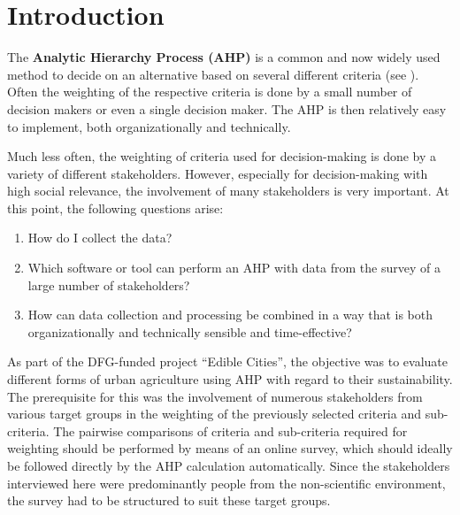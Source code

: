 \documentclass [oneside,10pt,a4paper,ngerman,BCOR10mm,headsepline,parindent,final]{scrartcl}
\providecommand{\tightlist}{%
      \setlength{\itemsep}{0pt}\setlength{\parskip}{0pt}}
\begin{document}
    \renewcommand{\sectionmark}[1]{
        \markboth{\thesection{} #1}{}
    }

    
    \tableofcontents
    
    


    
    \hypertarget{introduction}{%
\section{Introduction}\label{introduction}}

The \textbf{Analytic Hierarchy Process (AHP)} is a common and now widely
used method to decide on an alternative based on several different
criteria (see \cite{Wikipedia_AHP}). Often the weighting of the
respective criteria is done by a small number of decision makers or even
a single decision maker. The AHP is then relatively easy to implement,
both organizationally and technically.

Much less often, the weighting of criteria used for decision-making is
done by a variety of different stakeholders. However, especially for
decision-making with high social relevance, the involvement of many
stakeholders is very important. At this point, the following questions
arise:

\begin{enumerate}
\def\labelenumi{\arabic{enumi}.}
\tightlist
\item
  How do I collect the data?
\item
  Which software or tool can perform an AHP with data from the survey of
  a large number of stakeholders?
\item
  How can data collection and processing be combined in a way that is
  both organizationally and technically sensible and time-effective?
\end{enumerate}

As part of the DFG-funded project ``Edible Cities'', the objective was
to evaluate different forms of urban agriculture using AHP with regard
to their sustainability. The prerequisite for this was the involvement
of numerous stakeholders from various target groups in the weighting of
the previously selected criteria and sub-criteria. The pairwise
comparisons of criteria and sub-criteria required for weighting should
be performed by means of an online survey, which should ideally be
followed directly by the AHP calculation automatically. Since the
stakeholders interviewed here were predominantly people from the
non-scientific environment, the survey had to be structured to suit
these target groups.
\end{document}
